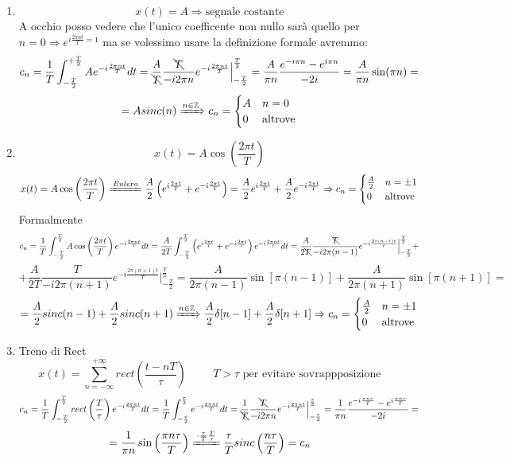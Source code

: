 \documentclass{article}
\begin{document}
\begin{enumerate}
    \item \[x(t)=A\Rightarrow\text{segnale costante}\]
        A occhio posso vedere che l'unico coefficente non nullo sarà quello per \(n=0\Rightarrow e^{i\frac{2\pi nt}{T}=1}\) ma se volessimo usare la definizione formale avremmo:
        \[c_n=\frac{1}{T}\int_{-\frac{T}{2}}^{+\frac{T}{2}}Ae^{-i\frac{2\pi nt}{T}}dt=\frac{A}{\bcancel{T}}\frac{\bcancel{T}}{-i2\pi n}e^{-i\frac{2\pi nt}{T}}\Big|_{-\frac{T}{2}}^{\frac{T}{2}}=\frac{A}{\pi n}\frac{e^{-i\pi n}-e^{i\pi n}}{-2i}=\frac{A}{\pi n}\sin(\pi n)=\]
        \[=Asinc(n)\xRightarrow{n\in\mathbb{Z}}c_n=\begin{cases}
            A&n=0\\0&\text{altrove}
        \end{cases}\]
    \item \[x(t)=A\cos\left(\frac{2\pi t}{T}\right)\]
        \[x(t)=A\cos\left(\frac{2\pi t}{T}\right)\xlongequal{Eulero}\frac{A}{2}\left(e^{i\frac{2\pi t}{T}}+e^{-i\frac{2\pi t}{T}}\right)=\frac{A}{2}e^{i\frac{2\pi t}{T}}+\frac{A}{2}e^{-i\frac{2\pi t}{T}}\Rightarrow c_n=\begin{cases}\frac{A}{2}&n=\pm1\\0&\text{altrove}\end{cases}\]
        Formalmente
        \[c_n=\frac{1}{T}\int_{-\frac{T}{2}}^{\frac{T}{2}}A\cos\left(\frac{2\pi t}{T}\right)e^{-i\frac{2\pi nt}{T}}dt=\frac{A}{2T}\int_{-\frac{T}{2}}^{\frac{T}{2}}\left(e^{i\frac{2\pi t}{T}}+e^{-i\frac{2\pi t}{T}}\right)e^{-i\frac{2\pi nt}{T}}dt=\frac{A}{2\bcancel{T}}\frac{\bcancel{T}}{-i2\pi(n-1)}e^{-i\frac{2\pi(n-1)t}{T}}\Big|_{-\frac{T}{2}}^\frac{T}{2}+\]
        \[+\frac{A}{2T}\frac{T}{-i2\pi(n+1)}e^{-i\frac{2\pi(n+1)t}{T}}\Big|_{-\frac{T}{2}}^\frac{T}{2}=\frac{A}{2\pi(n-1)}\sin[\pi(n-1)]+\frac{A}{2\pi(n+1)}\sin[\pi(n+1)]=\]
        \[=\frac{A}{2}sinc(n-1)+\frac{A}{2}sinc(n+1)\xRightarrow{n\in\mathbb{Z}}\frac{A}{2}\delta[n-1]+\frac{A}{2}\delta[n+1]\Rightarrow c_n=\begin{cases}\frac{A}{2}&n=\pm1\\0&\text{altrove}\end{cases}\]
    \item Treno di Rect\[x(t)=\sum_{n=-\infty}^{+\infty}rect\left(\frac{t-nT}{\tau}\right)\hspace{1cm}T>\tau\text{ per evitare sovrappposizione}\]
        \[c_n=\frac{1}{T}\int_{-\frac{T}{2}}^{\frac{T}{2}}rect\left(\frac{T}{\tau}\right)e^{-i\frac{2\pi nt}{T}}dt=\frac{1}{T}\int_{-\frac{\tau}{2}}^\frac{\tau}{2}e^{-i\frac{2\pi nt}{T}}dt=\frac{1}{\bcancel{T}}\frac{\bcancel{T}}{-i2\pi n}e^{-i\frac{2\pi nt}{T}}\Big|_{-\frac{\tau}{2}}^\frac{\tau}{2}=\frac{1}{\pi n}\frac{e^{-i\frac{\pi n\tau}{T}}-e^{i\frac{\pi n\tau}{T}}}{-2i}=\]
        \[=\frac{1}{\pi n}\sin\left(\frac{\pi n\tau}{T}\right)\xlongequal{\cdot\frac{\tau}{T}\frac{T}{\tau}}\frac{\tau}{T}sinc\left(\frac{n\tau}{T}\right)=c_n\]
\end{enumerate}
\end{document}
